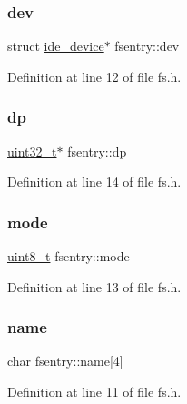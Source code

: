 \subsubsection{\texorpdfstring{dev}{dev}}
{\footnotesize\ttfamily struct \hyperlink{a00224}{ide\+\_\+device}$\ast$ fsentry\+::dev}



Definition at line 12 of file fs.\+h.

\mbox{\label{a00272_ae1d22893563b8753e29fef01f0782ba5_ae1d22893563b8753e29fef01f0782ba5}} 
\subsubsection{\texorpdfstring{dp}{dp}}
{\footnotesize\ttfamily \hyperlink{a00140_a435d1572bf3f880d55459d9805097f62_a435d1572bf3f880d55459d9805097f62}{uint32\+\_\+t}$\ast$ fsentry\+::dp}



Definition at line 14 of file fs.\+h.

\mbox{\label{a00272_a6e71712bc3c51c21dc3362334937e4d7_a6e71712bc3c51c21dc3362334937e4d7}} 
\subsubsection{\texorpdfstring{mode}{mode}}
{\footnotesize\ttfamily \hyperlink{a00140_aba7bc1797add20fe3efdf37ced1182c5_aba7bc1797add20fe3efdf37ced1182c5}{uint8\+\_\+t} fsentry\+::mode}



Definition at line 13 of file fs.\+h.

\mbox{\label{a00272_a9c5a4f5b02eb2c9e9e797f79dc99028a_a9c5a4f5b02eb2c9e9e797f79dc99028a}} 
\subsubsection{\texorpdfstring{name}{name}}
{\footnotesize\ttfamily char fsentry\+::name\mbox{[}4\mbox{]}}



Definition at line 11 of file fs.\+h.


